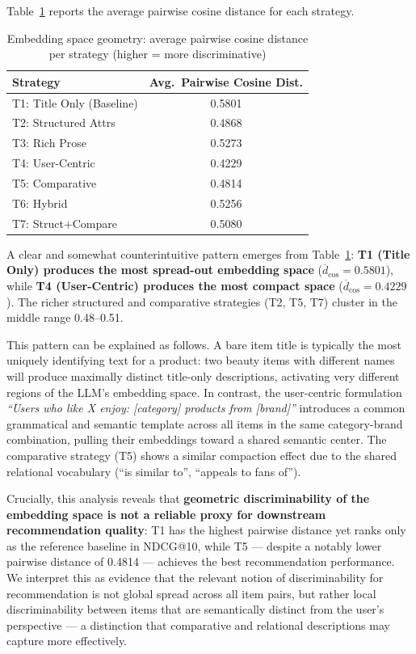 \documentclass[12pt,a4paper]{report}
\begin{document}
Table~\ref{tab:embedding_quality} reports the average
pairwise cosine distance for each strategy.

\begin{table}[ht]
\centering
\caption{Embedding space geometry: average pairwise cosine distance per strategy (higher = more discriminative)}
\label{tab:embedding_quality}
\renewcommand{\arraystretch}{1.3}
\small
\begin{tabular}{@{} l c @{}}
\toprule
\textbf{Strategy} & \textbf{Avg.\ Pairwise Cosine Dist.} \\
\midrule
T1: Title Only (Baseline) & 0.5801 \\
T2: Structured Attrs      & 0.4868 \\
T3: Rich Prose            & 0.5273 \\
T4: User-Centric          & 0.4229 \\
T5: Comparative           & 0.4814 \\
T6: Hybrid                & 0.5256 \\
T7: Struct+Compare        & 0.5080 \\
\bottomrule
\end{tabular}
\end{table}

A clear and somewhat counterintuitive pattern emerges from
Table~\ref{tab:embedding_quality}: \textbf{T1 (Title Only)
produces the most spread-out embedding space} ($\overline{d}_{\cos}
= 0.5801$), while \textbf{T4 (User-Centric) produces the most
compact space} ($\overline{d}_{\cos} = 0.4229$). The richer
structured and comparative strategies (T2, T5, T7) cluster
in the middle range 0.48--0.51.

This pattern can be explained as follows. A bare item title
is typically the most uniquely identifying text for a product:
two beauty items with different names will produce maximally
distinct title-only descriptions, activating very different
regions of the LLM's embedding space. In contrast, the
user-centric formulation \textit{``Users who like X enjoy:
[category] products from [brand]''} introduces a common
grammatical and semantic template across all items in the same
category-brand combination, pulling their embeddings toward
a shared semantic center. The comparative strategy (T5)
shows a similar compaction effect due to the shared relational
vocabulary (``is similar to'', ``appeals to fans of'').

Crucially, this analysis reveals that \textbf{geometric
discriminability of the embedding space is not a reliable
proxy for downstream recommendation quality}: T1 has the
highest pairwise distance yet ranks only as the reference
baseline in NDCG@10, while T5 --- despite a notably
lower pairwise distance of 0.4814 --- achieves the best
recommendation performance. We interpret this as evidence
that the relevant notion of discriminability for recommendation
is not global spread across all item pairs, but rather
local discriminability between items that are semantically
distinct from the user's perspective --- a distinction
that comparative and relational descriptions may capture
more effectively.
\end{document}
